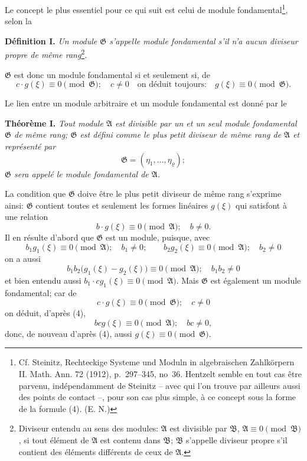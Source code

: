 \documentclass[11pt]{article}
\providecommand{\Amod}{\mathfrak A}
\providecommand{\Bmod}{\mathfrak B}
\providecommand{\Gmod}{\mathfrak G}
\providecommand{\zero}[1]{\equiv 0\pmod{#1}}
\begin{document}
Le concept le plus essentiel pour ce qui suit est celui de module fondamental\footnote{Cf. Steinitz, Rechteckige Systeme und Moduln in algebraischen Zahlkörpern II. Math. Ann. 72 (1912), p.~297--345, no~36. Hentzelt semble en tout cas être parvenu, indépendamment de Steinitz -- avec qui l'on trouve par ailleurs aussi des points de contact --, pour son cas plus simple, à ce concept sous la forme de la formule (4). (E. N.)}, selon la

\medskip
\noindent\textbf{Définition I.} \emph{Un module $\Gmod$ s'appelle module fondamental s'il n'a aucun diviseur propre de même rang}\footnote{Diviseur entendu au sens des modules: $\Amod$ est divisible par $\Bmod$, $\Amod\zero{\Bmod}$, si tout élément de $\Amod$ est contenu dans $\Bmod$; $\Bmod$ s'appelle diviseur propre s'il contient des éléments différents de ceux de $\Amod$.}.

$\Gmod$ est donc un module fondamental si et seulement si, de
\begin{equation}
 c\cdot g(\xi)\zero{\Gmod};\quad c\ne0 \quad\text{on déduit toujours:}\quad g(\xi)\zero{\Gmod}.
\tag{2}
\end{equation}

Le lien entre un module arbitraire et un module fondamental est donné par le

\medskip
\noindent\textbf{Théorème I.} \emph{Tout module $\Amod$ est divisible par un et un seul module fondamental $\Gmod$ de même rang; $\Gmod$ est défini comme le plus petit diviseur de même rang de $\Amod$ et représenté par}
\begin{equation}
 \Gmod=(\eta_1,\ldots,\eta_\varrho);
\tag{3}
\end{equation}
\emph{$\Gmod$ sera appelé le module fondamental de $\Amod$.}

La condition que $\Gmod$ doive être le plus petit diviseur de même rang s'exprime ainsi: $\Gmod$ contient toutes et seulement les formes linéaires $g(\xi)$ qui satisfont à une relation
\begin{equation}
 b\cdot g(\xi)\zero{\Amod};\quad b\ne0.
\tag{4}
\end{equation}
Il en résulte d'abord que $\Gmod$ est un module, puisque, avec
\[
 b_1g_1(\xi)\zero{\Amod};\quad b_1\ne0;
 \qquad
 b_2g_2(\xi)\zero{\Amod};\quad b_2\ne0
\]
on a aussi
\[
 b_1b_2\bigl(g_1(\xi)-g_2(\xi)\bigr)\zero{\Amod};\quad b_1b_2\ne0
\]
et bien entendu aussi $b_1\cdot c g_1(\xi)\zero{\Amod}$. Mais $\Gmod$ est également un module fondamental; car de
\[
 c\cdot g(\xi)\zero{\Gmod};\quad c\ne0
\]
on déduit, d'après (4),
\[
 b c g(\xi)\zero{\Amod};\quad bc\ne0,
\]
donc, de nouveau d'après (4), aussi $g(\xi)\zero{\Gmod}$.
\end{document}
